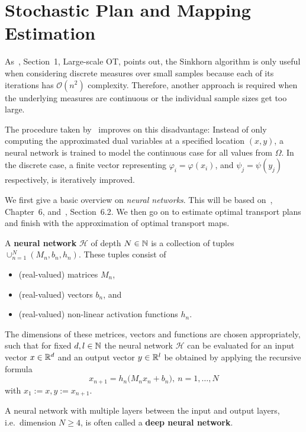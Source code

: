 
\section{Stochastic Plan and Mapping Estimation}\label{StoPlanAndMapEst}

As~\cite{Seg2018}, Section~1, Large-scale OT, points out, the Sinkhorn algorithm is only useful when considering discrete measures over small samples because each of its iterations has $\mathcal{O}(n^2)$ complexity. Therefore, another approach is required when the underlying measures are continuous or the individual sample sizes get too large.

The procedure taken by~\cite{Seg2018} improves on this disadvantage: Instead of only computing the approximated dual variables at a specified location $(x, y)$, a neural network is trained to model the continuous case for all values from $\Omega$. In the discrete case, a finite vector representing $\varphi_i = \varphi(x_i)$, and $\psi_j = \psi(y_j)$ respectively, is iteratively improved.

We first give a basic overview on \textit{neural networks}. This will be based on\ \cite{Good2016}, Chapter~6, and\ \cite{Brag2020}, Section~6.2. We then go on to estimate optimal transport plans and finish with the approximation of optimal transport maps.

\begin{definition}
	A \textbf{neural network} $\mathcal{H}$ of depth $\NinN[N]$ is a collection of tuples $\cup_{n = 1}^{N} (M_n, b_n, h_n)$. These tuples consist of
	\begin{itemize}
		\item (real-valued) matrices $M_n$,
		\item (real-valued) vectors $b_n$, and
		\item (real-valued) non-linear activation functions $h_n$.
	\end{itemize}
	The dimensions of these metrices, vectors and functions are chosen appropriately, such that for fixed $\NinN[d, l]$ the neural network $\mathcal{H}$ can be evaluated for an input vector $x \in \R^d$ and an output vector $y \in \R^l$ be obtained by applying the recursive formula
	\[ x_{n + 1} = h_n\big( M_n x_n + b_n \big),\ n = 1, \dots, N \]
	with $x_1 := x, y := x_{n + 1}$.

	A neural network with multiple layers between the input and output layers, i.e.\ dimension $N \ge 4$, is often called a \textbf{deep neural network}.
\end{definition}

